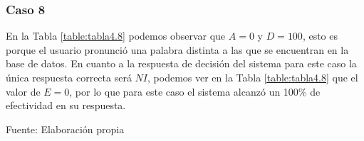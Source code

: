 \subsubsection{Caso 8}
En la Tabla \ref{table:tabla4.8} podemos observar que $A = 0$ y $D = 100$, esto es porque el usuario pronunció una palabra distinta a las que se encuentran en la base de datos.
\vskip 0.5cm
En cuanto a la respuesta de decisión del sistema para este caso la única respuesta correcta será $NI$, podemos ver en la Tabla \ref{table:tabla4.8} que el valor de $E = 0$, por lo que para este caso el sistema alcanzó un 100\% de efectividad en su respuesta.

\begin{center}
\begin{table}[H]
\centering
\caption{\small{: Resultados para obtener U2 en el caso 8.}}
\label{table:tabla4.8}
\vskip 0.2cm
\begin{center}
\vskip 0.2cm
{\small{Fuente: Elaboración propia}}
\end{center}
\end{table}
\end{center}

